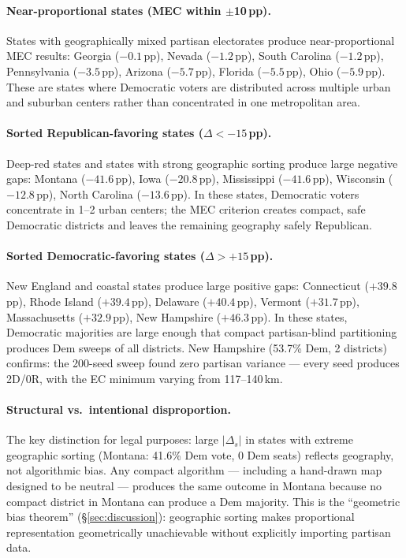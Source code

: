 \paragraph{Near-proportional states (MEC within $\pm$10\,pp).}
States with geographically mixed partisan electorates produce near-proportional
MEC results: Georgia ($-0.1$\,pp), Nevada ($-1.2$\,pp), South Carolina
($-1.2$\,pp), Pennsylvania ($-3.5$\,pp), Arizona ($-5.7$\,pp), Florida
($-5.5$\,pp), Ohio ($-5.9$\,pp). These are states where Democratic voters
are distributed across multiple urban and suburban centers rather than
concentrated in one metropolitan area.

\paragraph{Sorted Republican-favoring states ($\Delta < -15$\,pp).}
Deep-red states and states with strong geographic sorting produce large
negative gaps: Montana ($-41.6$\,pp), Iowa ($-20.8$\,pp), Mississippi
($-41.6$\,pp), Wisconsin ($-12.8$\,pp), North Carolina ($-13.6$\,pp). In
these states, Democratic voters concentrate in 1--2 urban centers; the MEC
criterion creates compact, safe Democratic districts and leaves the remaining
geography safely Republican.

\paragraph{Sorted Democratic-favoring states ($\Delta > +15$\,pp).}
New England and coastal states produce large positive gaps: Connecticut
($+39.8$\,pp), Rhode Island ($+39.4$\,pp), Delaware ($+40.4$\,pp),
Vermont ($+31.7$\,pp), Massachusetts ($+32.9$\,pp), New Hampshire ($+46.3$\,pp).
In these states, Democratic majorities are large enough that compact partisan-blind
partitioning produces Dem sweeps of all districts. New Hampshire
(53.7\% Dem, 2 districts) confirms: the 200-seed sweep found zero partisan
variance --- every seed produces 2D/0R, with the EC minimum varying from
117--140\,km.

\paragraph{Structural vs.\ intentional disproportion.}
The key distinction for legal purposes: large $|\Delta_s|$ in states with
extreme geographic sorting (Montana: 41.6\% Dem vote, 0 Dem seats) reflects
geography, not algorithmic bias. Any compact algorithm --- including a
hand-drawn map designed to be neutral --- produces the same outcome in Montana
because no compact district in Montana can produce a Dem majority. This is
the ``geometric bias theorem'' (\S\ref{sec:discussion}): geographic sorting
makes proportional representation geometrically unachievable without
explicitly importing partisan data.

